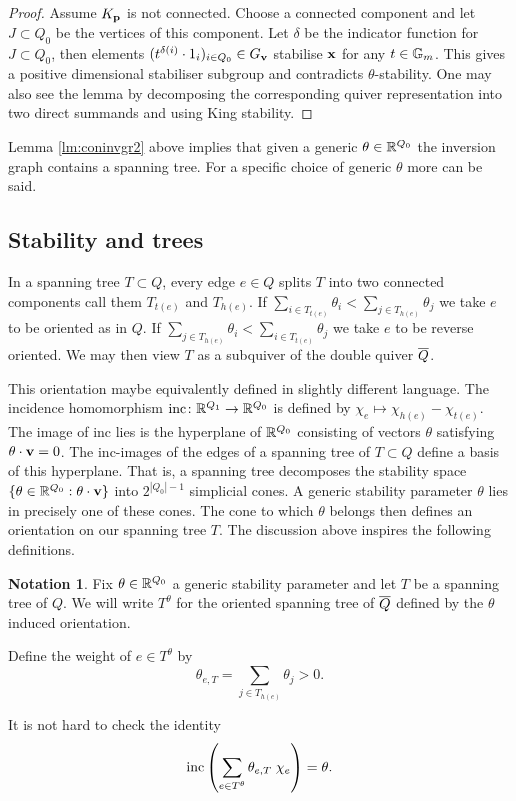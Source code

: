 \documentclass{amsart}
\theoremstyle{definition}
\newtheorem{notn}[thm]{Notation}
\begin{document}
\begin{proof}
Assume $K_{\mathbf{p}}$ is not connected. Choose a connected component and let $J \subset Q_0$ be the vertices of this component. 
Let $\delta$ be the indicator function for $J \subset Q_0$, then elements $(t^{\delta(i)}\cdot 1_i)_{i \in Q_0} \in  G_{\mathbf{v}}$ stabilise $\mathbf{x}$ for any $t \in \mathbb{G}_m$.
This gives a positive dimensional stabiliser subgroup and contradicts $\theta$-stability.
One may also see the lemma by decomposing the corresponding quiver representation into two direct summands and using King stability.
\end{proof}

Lemma \ref{lm:coninvgr2} above implies that given a generic $\theta \in \mathbb{R}^{Q_0}$ the inversion graph contains a spanning tree.
For a specific choice of generic $\theta$ more can be said.

\subsection{Stability and trees}
In a spanning tree $T \subset Q$, every edge $e \in Q$ splits $T$ into two connected components call them $T_{t(e)}$ and $T_{h(e)}$.
If $\sum_{i \in T_{t(e)}} \theta_i < \sum_{j \in T_{h(e)}}\theta_j$ we take $e$ to be oriented as in $Q$.
If $\sum_{j \in T_{h(e)}} \theta_i < \sum_{i \in T_{t(e)}}\theta_j$ we take $e$ to be reverse oriented.
We may then view $T$ as a subquiver of the double quiver ${\overline{Q}}$. 

This orientation maybe equivalently defined in slightly different language.
The incidence homomorphism $\textup{inc} \colon \mathbb{R}^{Q_1} \rightarrow \mathbb{R}^{Q_0}$ is defined by $\chi_e \mapsto \chi_{h(e)}-\chi_{t(e)}$.
The image of $\text{inc}$ lies is the hyperplane of $\mathbb{R}^{Q_0}$ consisting of vectors $\theta$ satisfying $\theta\cdot \mathbf{v}=0$. The inc-images of the edges of a spanning tree of $T \subset Q$ define a basis of this hyperplane. That is, a spanning tree decomposes the stability space $\{\theta\in \mathbb{R}^{Q_0}:\theta\cdot \mathbf{v}\}$ into $2^{|Q_0|-1}$ simplicial cones.
A generic stability parameter $\theta$ lies in precisely one of these cones.
The cone to which $\theta$ belongs then defines an orientation on our spanning tree $T$.
The discussion above inspires the following definitions.

\begin{notn}\label{notn:orientedtree}
Fix $\theta \in \mathbb{R}^{Q_0}$ a generic stability parameter and let $T$ be a spanning tree of $Q$. 
We will write $T^\theta$ for the oriented spanning tree of ${\overline{Q}}$ defined by the $\theta$ induced orientation.

Define the weight of $e\in T^\theta$ by
$$
\theta_{e,T} = \sum_{j\in T_{h(e)}} \theta_j>0.
$$
\end{notn}
It is not hard to check the identity
$$
\textup{inc}\left(\sum_{e\in T^\theta} \theta_{e,T}\; \chi_e\right) = \theta.
$$
\end{document}
